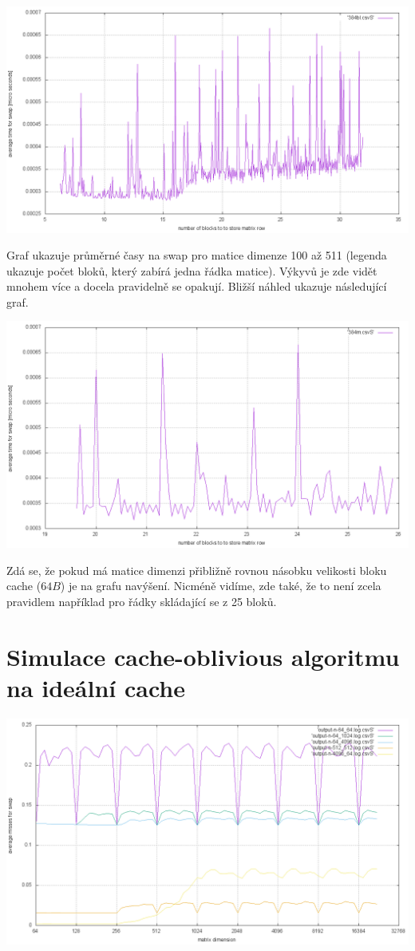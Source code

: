 \documentclass[12pt,a4paper]{report}
\begin{document}
\includegraphics[width=\textwidth]{./tests/graph1-0.png}

Graf ukazuje průměrné časy na swap pro matice dimenze 100 až 511 (legenda ukazuje počet bloků, který zabírá jedna řádka matice).
Výkyvů je zde vidět mnohem více a docela pravidelně se opakují. Bližší náhled ukazuje následující graf.

\includegraphics[width=\textwidth]{./tests/graph1-1.png}

Zdá se, že pokud má matice dimenzi přibližně rovnou násobku velikosti bloku cache ($64 B$) je na grafu navýšení. Nicméně vidíme,
zde také, že to není zcela pravidlem například pro řádky skládající se z 25 bloků.


\section{Simulace cache-oblivious algoritmu na ideální cache}
\includegraphics[width=\textwidth]{./tests/graph2.png}
\end{document}
